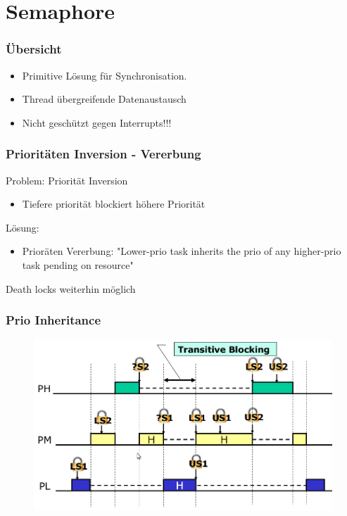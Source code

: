 \section{Semaphore}
\begin{frame}
  \tableofcontents[
	    currentsection, 
	    hideothersections, 
	    sectionstyle=show/shaded, 
	    subsectionstyle=hide
	]
\end{frame}


\begin{frame}
  \frametitle{Übersicht}
	\begin{itemize}
	  \item Primitive Lösung für Synchronisation.
	  \item Thread übergreifende Datenaustausch 
	  \item Nicht geschützt gegen Interrupts!!!
	\end{itemize}
\end{frame}



%
%
\begin{frame}
  \frametitle{Prioritäten Inversion - Vererbung}
  Problem: Priorität Inversion
	\begin{itemize}
	  \item Tiefere priorität blockiert höhere Priorität
	\end{itemize}
	Lösung:
  \begin{itemize}
	  \item Prioräten Vererbung: "Lower-prio task inherits the prio of any higher-prio task pending on resource"
	\end{itemize}
	\bigskip
	Death locks weiterhin möglich
\end{frame}


\begin{frame}
  \frametitle{Prio Inheritance}
  \begin{figure}
  \includegraphics[scale=0.3]{pic/02_sem/sem_01.png} 
  \end{figure}
\end{frame}


